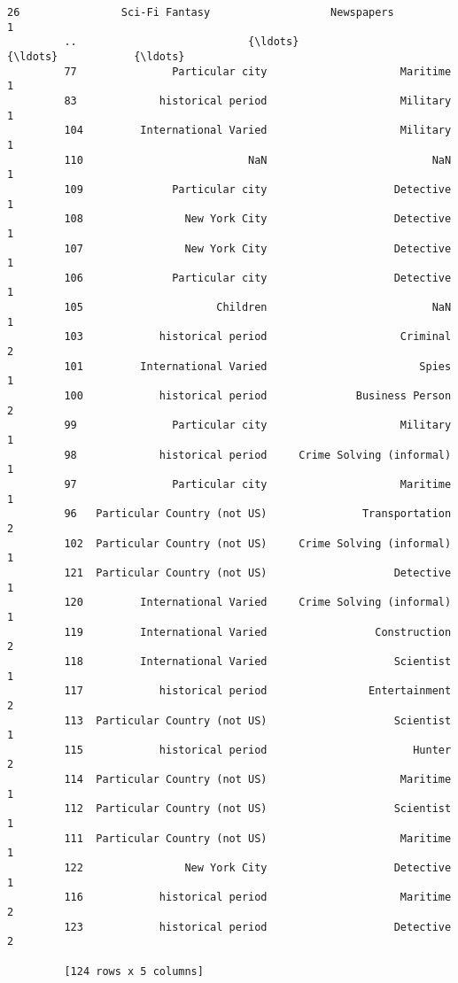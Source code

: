 \documentclass[11pt]{article}
\begin{document}
\begin{Verbatim}[commandchars=\\\{\}]
         26                Sci-Fi Fantasy                   Newspapers              1  
         ..                           {\ldots}                          {\ldots}            {\ldots}  
         77               Particular city                     Maritime              1  
         83             historical period                     Military              1  
         104         International Varied                     Military              1  
         110                          NaN                          NaN              1  
         109              Particular city                    Detective              1  
         108                New York City                    Detective              1  
         107                New York City                    Detective              1  
         106              Particular city                    Detective              1  
         105                     Children                          NaN              1  
         103            historical period                     Criminal              2  
         101         International Varied                        Spies              1  
         100            historical period              Business Person              2  
         99               Particular city                     Military              1  
         98             historical period     Crime Solving (informal)              1  
         97               Particular city                     Maritime              1  
         96   Particular Country (not US)               Transportation              2  
         102  Particular Country (not US)     Crime Solving (informal)              1  
         121  Particular Country (not US)                    Detective              1  
         120         International Varied     Crime Solving (informal)              1  
         119         International Varied                 Construction              2  
         118         International Varied                    Scientist              1  
         117            historical period                Entertainment              2  
         113  Particular Country (not US)                    Scientist              1  
         115            historical period                       Hunter              2  
         114  Particular Country (not US)                     Maritime              1  
         112  Particular Country (not US)                    Scientist              1  
         111  Particular Country (not US)                     Maritime              1  
         122                New York City                    Detective              1  
         116            historical period                     Maritime              2  
         123            historical period                    Detective              2  
         
         [124 rows x 5 columns]
\end{Verbatim}
            
\end{document}
